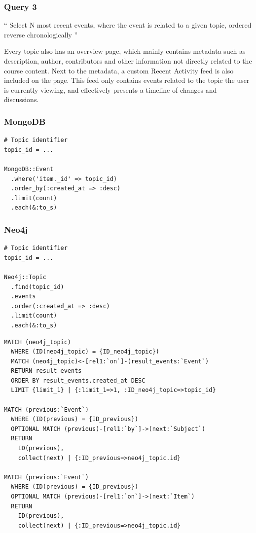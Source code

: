 \subsubsection{Query 3}
\label{subsubsec:query-3}

``
Select N most recent events, where the event is related to a given topic, ordered reverse chronologically
''

Every topic also has an overview page, which mainly contains metadata such as description, author, contributors and other information not directly related to the course content.
Next to the metadata, a custom Recent Activity feed is also included on the page.
This feed only contains events related to the topic the user is currently viewing, and effectively presents a timeline of changes and discussions.

\subsubsection*{MongoDB}

\begin{verbatim}
# Topic identifier
topic_id = ...

MongoDB::Event
  .where('item._id' => topic_id)
  .order_by(:created_at => :desc)
  .limit(count)
  .each(&:to_s)
\end{verbatim}

\subsubsection*{Neo4j}

\begin{verbatim}
# Topic identifier
topic_id = ...

Neo4j::Topic
  .find(topic_id)
  .events
  .order(:created_at => :desc)
  .limit(count)
  .each(&:to_s)
\end{verbatim}

\begin{verbatim}
MATCH (neo4j_topic)
  WHERE (ID(neo4j_topic) = {ID_neo4j_topic})
  MATCH (neo4j_topic)<-[rel1:`on`]-(result_events:`Event`)
  RETURN result_events
  ORDER BY result_events.created_at DESC
  LIMIT {limit_1} | {:limit_1=>1, :ID_neo4j_topic=>topic_id}

MATCH (previous:`Event`)
  WHERE (ID(previous) = {ID_previous})
  OPTIONAL MATCH (previous)-[rel1:`by`]->(next:`Subject`)
  RETURN
    ID(previous),
    collect(next) | {:ID_previous=>neo4j_topic.id}

MATCH (previous:`Event`)
  WHERE (ID(previous) = {ID_previous})
  OPTIONAL MATCH (previous)-[rel1:`on`]->(next:`Item`)
  RETURN
    ID(previous),
    collect(next) | {:ID_previous=>neo4j_topic.id}
\end{verbatim}

